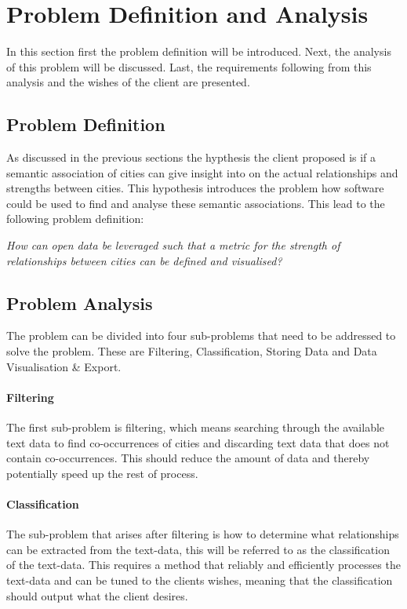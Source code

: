 \section{Problem Definition and Analysis}\label{sec:problem-definition-analysis}
In this section first the problem definition will be introduced. Next, the analysis of this problem will be discussed. Last, the requirements following from this analysis and the wishes of the client are presented.

\subsection{Problem Definition}
As discussed in the previous sections the hypthesis the client proposed is if a semantic association of cities can give insight into on the actual relationships and strengths between cities. This hypothesis introduces the problem how software could be used to find and analyse these semantic associations. This lead to the following problem definition:\\

\begin{minipage}{0.75\textwidth}
\centering
\textit{How can open data be leveraged such that a metric for the strength of relationships between cities can be defined and visualised?}
\end{minipage}

\subsection{Problem Analysis}
The problem can be divided into four sub-problems that need to be addressed to solve the problem. These are Filtering, Classification, Storing Data and  Data Visualisation \& Export. 

\paragraph{Filtering}
The first sub-problem is filtering, which means searching through the available text data to find co-occurrences of cities and discarding text data that does not contain co-occurrences. This should reduce the amount of data and thereby potentially speed up the rest of process.

\paragraph{Classification}
The sub-problem that arises after filtering is how to determine what relationships can be extracted from the text-data, this will be referred to as the classification of the text-data. This requires a method that reliably and efficiently processes the text-data and can be tuned to the clients wishes, meaning that the classification should output what the client desires. 


